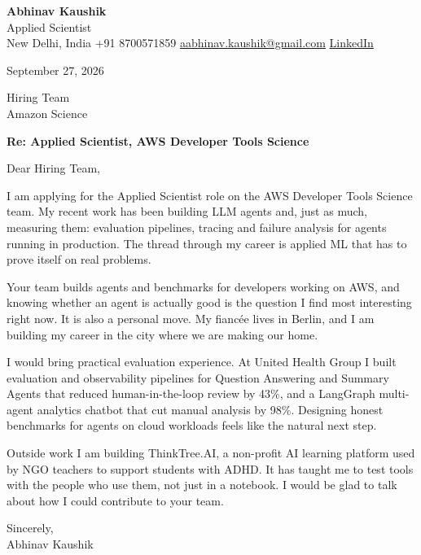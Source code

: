 \documentclass[11pt,a4paper]{article}
\begin{document}
{\Large\bfseries Abhinav Kaushik}\\
Applied Scientist\\
New Delhi, India \textbar{} +91 8700571859 \textbar{} \href{mailto:aabhinav.kaushik@gmail.com}{aabhinav.kaushik@gmail.com} \textbar{} \href{https://www.linkedin.com/in/abhinav-kaushik10/}{LinkedIn}  

September 27, 2026

Hiring Team\\
Amazon Science

\textbf{Re: Applied Scientist, AWS Developer Tools Science}

Dear Hiring Team,

I am applying for the Applied Scientist role on the AWS Developer Tools Science team. My recent work has been building LLM agents and, just as much, measuring them: evaluation pipelines, tracing and failure analysis for agents running in production. The thread through my career is applied ML that has to prove itself on real problems.

Your team builds agents and benchmarks for developers working on AWS, and knowing whether an agent is actually good is the question I find most interesting right now. It is also a personal move. My fiancée lives in Berlin, and I am building my career in the city where we are making our home.

I would bring practical evaluation experience. At United Health Group I built evaluation and observability pipelines for Question Answering and Summary Agents that reduced human-in-the-loop review by 43\%, and a LangGraph multi-agent analytics chatbot that cut manual analysis by 98\%. Designing honest benchmarks for agents on cloud workloads feels like the natural next step.

Outside work I am building ThinkTree.AI, a non-profit AI learning platform used by NGO teachers to support students with ADHD. It has taught me to test tools with the people who use them, not just in a notebook. I would be glad to talk about how I could contribute to your team.

Sincerely,\\[4pt]
Abhinav Kaushik
\end{document}
